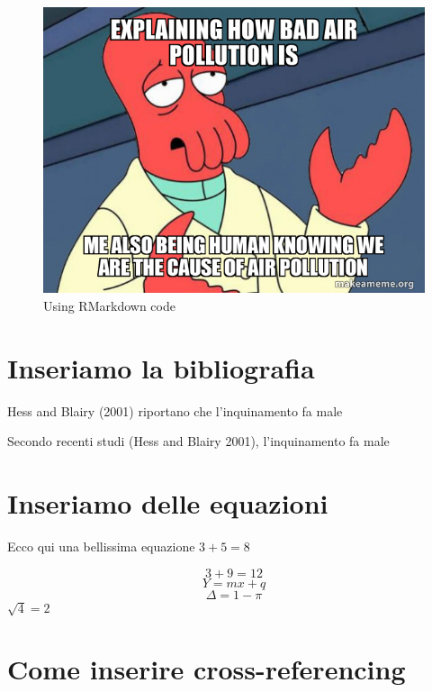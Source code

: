 \documentclass[
]{article}
\begin{document}
\begin{figure}

{\centering \includegraphics[width=0.75\linewidth]{pics/explaining-how-bad-8943e8c056} 

}

\caption{Using RMarkdown code}\label{fig:unnamed-chunk-1}
\end{figure}
\newpage

\hypertarget{inseriamo-la-bibliografia}{%
\section{Inseriamo la bibliografia}\label{inseriamo-la-bibliografia}}

Hess and Blairy (2001) riportano che l'inquinamento fa male

Secondo recenti studi (Hess and Blairy 2001), l'inquinamento fa male

\newpage

\hypertarget{inseriamo-delle-equazioni}{%
\section{Inseriamo delle equazioni}\label{inseriamo-delle-equazioni}}

Ecco qui una bellissima equazione \(3 + 5 = 8\)

\[3 + 9 = 12\]
\[ Y = mx + q\]
\[ \Delta = 1 - \pi\]
\(\sqrt{4} = 2\)

\newpage

\hypertarget{come-inserire-cross-referencing}{%
\section{Come inserire cross-referencing}\label{come-inserire-cross-referencing}}
\end{document}
